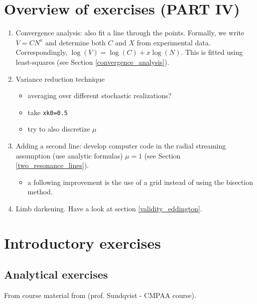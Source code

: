 \documentclass[../main/main.tex]{subfiles}
\begin{document}
\newpage
\section{Overview of exercises (PART IV)}
\label{Overview_Part_4}

\begin{enumerate}
\item Convergence analysis: also fit a line through the points. Formally, we write $V = CN^x$ and determine both $C$ and $X$ from experimental data. Correspondingly, $\log(V) = \log(C) + x\log(N)$. This is fitted using least-squares (see Section \underline{\ref{convergence_analysis}}).

\item Variance reduction technique
\begin{itemize}
\item averaging over different stochastic realizations?
\item take \texttt{xk0=0.5}
\item try to also discretize $\mu$
\end{itemize}

\item Adding a second line: develop computer code in the radial streaming assumption (use analytic formulas) $\mu = 1$ (see Section \underline{\ref{two_resonance_lines}}).
\begin{itemize}
\item a following improvement is the use of a grid instead of using the bisection method.
\end{itemize}

\item Limb darkening. Have a look at section \ref{validity_eddington}.

\end{enumerate}




\newpage
\section{Introductory exercises}

\subsection{Analytical exercises}
From course material from (prof. Sundqvist - CMPAA course).
\end{document}
